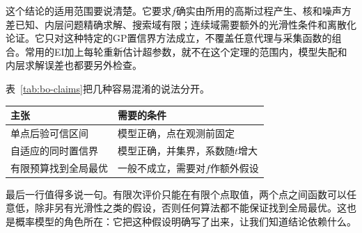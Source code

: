 这个结论的适用范围要说清楚。它要求$f$确实由所用的高斯过程产生、核和噪声方差已知、内层问题精确求解、搜索域有限；连续域需要额外的光滑性条件和离散化论证。它只对这种特定的GP置信界方法成立，不覆盖任意代理与采集函数的组合。常用的EI加上每轮重新估计超参数，就不在这个定理的范围内，模型失配和内层求解误差也都要另外检查。

表~\ref{tab:bo-claims}把几种容易混淆的说法分开。

\begin{BookInlineTable}
 \centering
 \caption{三种不同的主张。}
 \label{tab:bo-claims}
 \begin{tabular}{ll}
 \toprule
 主张&需要的条件\\
 \midrule
 单点后验可信区间&模型正确，点在观测前固定\\
 自适应的同时置信界&模型正确，并集界，系数随$t$增大\\
 有限预算找到全局最优&一般不成立，需要对$f$作额外假设\\
 \bottomrule
 \end{tabular}
\end{BookInlineTable}

最后一行值得多说一句。有限次评价只能在有限个点取值，两个点之间函数可以任意低，除非另有光滑性之类的假设，否则任何算法都不能保证找到全局最优。这也是概率模型的角色所在：它把这种假设明确写了出来，让我们知道结论依赖什么。
